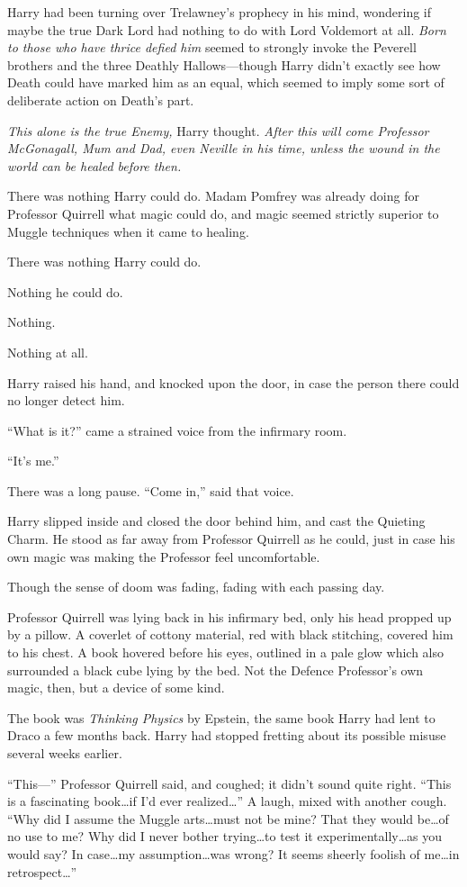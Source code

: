 Harry had been turning over Trelawney’s prophecy in his mind, wondering if maybe the true Dark Lord had nothing to do with Lord Voldemort at all. \emph{Born to those who have thrice defied him} seemed to strongly invoke the Peverell brothers and the three Deathly Hallows—though Harry didn’t exactly see how Death could have marked him as an equal, which seemed to imply some sort of deliberate action on Death’s part.

\emph{This alone is the true Enemy,} Harry thought. \emph{After this will come Professor McGonagall, Mum and Dad, even Neville in his time, unless the wound in the world can be healed before then.}

There was nothing Harry could do. Madam Pomfrey was already doing for Professor Quirrell what magic could do, and magic seemed strictly superior to Muggle techniques when it came to healing.

There was nothing Harry could do.

Nothing he could do.

Nothing.

Nothing at all.

\later

Harry raised his hand, and knocked upon the door, in case the person there could no longer detect him.

“What is it?” came a strained voice from the infirmary room.

“It’s me.”

There was a long pause. “Come in,” said that voice.

Harry slipped inside and closed the door behind him, and cast the Quieting Charm. He stood as far away from Professor Quirrell as he could, just in case his own magic was making the Professor feel uncomfortable.

Though the sense of doom was fading, fading with each passing day.

Professor Quirrell was lying back in his infirmary bed, only his head propped up by a pillow. A coverlet of cottony material, red with black stitching, covered him to his chest. A book hovered before his eyes, outlined in a pale glow which also surrounded a black cube lying by the bed. Not the Defence Professor’s own magic, then, but a device of some kind.

The book was \emph{Thinking Physics} by Epstein, the same book Harry had lent to Draco a few months back. Harry had stopped fretting about its possible misuse several weeks earlier.

“This—” Professor Quirrell said, and coughed; it didn’t sound quite right. “This is a fascinating book…if I’d ever realized…” A laugh, mixed with another cough. “Why did I assume the Muggle arts…must not be mine? That they would be…of no use to me? Why did I never bother trying…to test it experimentally…as you would say? In case…my assumption…was wrong? It seems sheerly foolish of me…in retrospect…”

